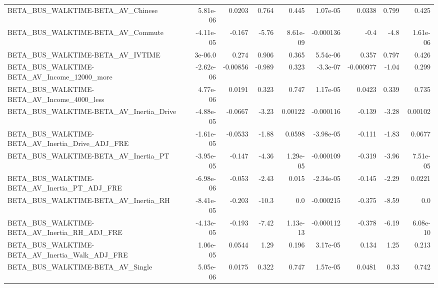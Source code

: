 \begin{tabular}{lrrrrrrrr}
BETA\_BUS\_WALKTIME-BETA\_AV\_Chinese                  &    5.81e-06 &       0.0203 &    0.764 &    0.445 &   1.07e-05 &      0.0338 &        0.799 &         0.425 \\
BETA\_BUS\_WALKTIME-BETA\_AV\_Commute                  &   -4.11e-05 &       -0.167 &    -5.76 & 8.61e-09 &  -0.000136 &        -0.4 &         -4.8 &      1.61e-06 \\
BETA\_BUS\_WALKTIME-BETA\_AV\_IVTIME                   &     3e-06.0 &        0.274 &    0.906 &    0.365 &   5.54e-06 &       0.357 &        0.797 &         0.426 \\
BETA\_BUS\_WALKTIME-BETA\_AV\_Income\_12000\_more        &   -2.62e-06 &     -0.00856 &   -0.989 &    0.323 &   -3.3e-07 &   -0.000977 &        -1.04 &         0.299 \\
BETA\_BUS\_WALKTIME-BETA\_AV\_Income\_4000\_less         &    4.77e-06 &       0.0191 &    0.323 &    0.747 &   1.17e-05 &      0.0423 &        0.339 &         0.735 \\
BETA\_BUS\_WALKTIME-BETA\_AV\_Inertia\_Drive            &   -4.88e-05 &      -0.0667 &    -3.23 &  0.00122 &  -0.000116 &      -0.139 &        -3.28 &       0.00102 \\
BETA\_BUS\_WALKTIME-BETA\_AV\_Inertia\_Drive\_ADJ\_FRE    &   -1.61e-05 &      -0.0533 &    -1.88 &   0.0598 &  -3.98e-05 &      -0.111 &        -1.83 &        0.0677 \\
BETA\_BUS\_WALKTIME-BETA\_AV\_Inertia\_PT               &   -3.95e-05 &       -0.147 &    -4.36 & 1.29e-05 &  -0.000109 &      -0.319 &        -3.96 &      7.51e-05 \\
BETA\_BUS\_WALKTIME-BETA\_AV\_Inertia\_PT\_ADJ\_FRE       &   -6.98e-06 &       -0.053 &    -2.43 &    0.015 &  -2.34e-05 &      -0.145 &        -2.29 &        0.0221 \\
BETA\_BUS\_WALKTIME-BETA\_AV\_Inertia\_RH               &   -8.41e-05 &       -0.203 &    -10.3 &      0.0 &  -0.000215 &      -0.375 &        -8.59 &           0.0 \\
BETA\_BUS\_WALKTIME-BETA\_AV\_Inertia\_RH\_ADJ\_FRE       &   -4.13e-05 &       -0.193 &    -7.42 & 1.13e-13 &  -0.000112 &      -0.378 &        -6.19 &      6.08e-10 \\
BETA\_BUS\_WALKTIME-BETA\_AV\_Inertia\_Walk\_ADJ\_FRE     &    1.06e-05 &       0.0544 &     1.29 &    0.196 &   3.17e-05 &       0.134 &         1.25 &         0.213 \\
BETA\_BUS\_WALKTIME-BETA\_AV\_Single                   &    5.05e-06 &       0.0175 &    0.322 &    0.747 &   1.57e-05 &      0.0481 &         0.33 &         0.742 \\

\end{tabular}
